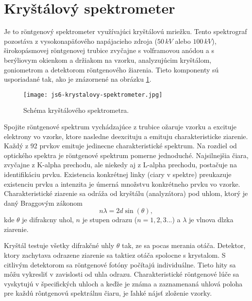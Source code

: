 \documentclass[../../main.tex]{subfiles}
\begin{document}
\section{Kryštálový spektrometer}
Je to röntgenový spektrometer využívajúci kryštálovú mriežku. Tento spektrograf pozostáva z vysokonapäťového napájacieho zdroja ($50\,kV$ alebo $100\,kV$), širokopásmovej röntgenovej trubice zvyčajne s volframovou anódou a s berýliovym okienkom a držiakom na vzorku, analyzujúcim kryštálom, goniometrom a detektorom röntgenového žiarenia. Tieto komponenty sú usporiadané tak, ako je znázornené na obrázku \ref{js6:fig:crystal_spectrometer}. 
\begin{figure}[!h]
\centering
\texttt{[image: js6-krystalovy-spektrometer.jpg]}
\caption{Schéma kryštálového spektrometra.}
\label{js6:fig:crystal_spectrometer}
\end{figure}
Spojite r\"{o}ntgenové spektrum vychádzajúce z trubice ožaruje vzorku a excituje elektrony vo vzorke, ktore nasledne deexcituju a emituju charakteristicke ziarenie. Každý z 92 prvkov emituje jedinecne charakteristické spektrum. Na rozdiel od optického spektra je röntgenové spektrum pomerne jednoduché. Najsilnejšia čiara, zvyčajne z K-alpha prechodu, ale niekedy aj z L-alpha prechodu, postačuje na identifikáciu prvku. Existencia konkrétnej linky (ciary v spektre) preukazuje existenciu prvku a intenzita je úmerná množstvu konkrétneho prvku vo vzorke. Charakteristické ziarenie sa odráža od kryštálu (analyzátora) pod uhlom, ktorý je daný Braggovým zákonom $$ n\lambda = 2d\sin(\theta), $$ kde $\theta$ je difrakcny uhol, $n$ je stupen odrazu ($n=1,2,3...$) a $\lambda$ je vlnova dlzka ziarenie.\par 
Kryštál testuje všetky difrakčné uhly $\theta$ tak, ze sa pocas merania otáča. Detektor, ktory zachytava odrazene ziarenie sa taktiez otáča spolocne s krystalom. S citlivým detektorom sa röntgenové fotóny počítajú individuálne. Tieto hity sa môžu vykresliť v zavislosti od uhla odrazu. Charakteristické röntgenové lúče sa vyskytujú v špecifických uhloch a keďže je známa a zaznamenaná uhlová poloha pre každú rôntgenovú spektrálnu čiaru, je ľahké nájsť zloženie vzorky.
\end{document}
